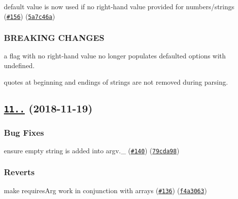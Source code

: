 \begin{DoxyItemize}
\item default value is now used if no right-\/hand value provided for numbers/strings (\href{https://github.com/yargs/yargs-parser/issues/156}{\tt \#156}) (\href{https://github.com/yargs/yargs-parser/commit/5a7c46a}{\tt 5a7c46a})
\end{DoxyItemize}

\subsubsection*{B\+R\+E\+A\+K\+I\+NG C\+H\+A\+N\+G\+ES}


\begin{DoxyItemize}
\item a flag with no right-\/hand value no longer populates defaulted options with {\ttfamily undefined}.
\item quotes at beginning and endings of strings are not removed during parsing.
\end{DoxyItemize}

\label{_11.1.1}%
 \subsection*{\href{https://github.com/yargs/yargs-parser/compare/v11.1.0...v11.1.1}{\tt 11..} (2018-\/11-\/19)}

\subsubsection*{Bug Fixes}


\begin{DoxyItemize}
\item ensure empty string is added into argv.\+\_\+ (\href{https://github.com/yargs/yargs-parser/issues/140}{\tt \#140}) (\href{https://github.com/yargs/yargs-parser/commit/79cda98}{\tt 79cda98})
\end{DoxyItemize}

\subsubsection*{Reverts}


\begin{DoxyItemize}
\item make requires\+Arg work in conjunction with arrays (\href{https://github.com/yargs/yargs-parser/issues/136}{\tt \#136}) (\href{https://github.com/yargs/yargs-parser/commit/f4a3063}{\tt f4a3063})
\end{DoxyItemize}

